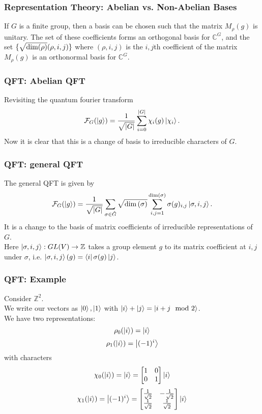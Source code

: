 \documentclass{beamer}
\renewcommand{\bra}{\Bra}
\renewcommand{\ket}{\Ket}
\newcommand{\abs}[1]{\left\lvert #1 \right\rvert}
\renewcommand{\dim}[1]{\textnormal{dim}\left(#1\right)}
\newcommand{\bb}[1]{\mathbb{#1}}
\renewcommand{\cal}[1]{\mathcal{#1}}
\begin{document}
\begin{frame}
\frametitle{Representation Theory: Abelian vs. Non-Abelian Bases}
        \begin{theorem}\label{thm:matrix_coefficients}
                If $G$ is a finite group, then a basis can be chosen such that the matrix $M_\rho(g)$ is unitary. The set of these coefficients forms an orthogonal basis for $\bb{C}^G$, and the set $\{\sqrt{\textnormal{dim}(\rho)} (\rho, i, j)\}$ where $(\rho, i, j)$ is the $i,j$th coefficient of the matrix $M_\rho(g)$ is an orthonormal basis for $\bb{C}^G$.
        \end{theorem}
\end{frame}

\begin{frame}
\frametitle{QFT: Abelian QFT}
        Revisiting the quantum fourier transform
                $$\cal{F}_G(\ket{g}) = \frac{1}{\sqrt{\abs{G}}} \sum_{i=0}^{\abs{G}} \chi_i(g) \ket{\chi_i}.$$
        Now it is clear that this is a change of basis to irreducible characters of $G$.
\end{frame}

\begin{frame}
\frametitle{QFT: general QFT}
    The general QFT is given by
        $$\cal{F}_G(\ket{g}) = \frac{1}{\sqrt{\abs{G}}} \sum_{\sigma \in \hat{G}} \sqrt{\dim{\sigma}} \sum_{i,j = 1}^{\dim{\sigma}} \sigma(g)_{i,j} \ket{\sigma, i, j}.$$
    It is a change to the basis of matrix coefficients of irreducible representations of $G$.\\
    Here $\ket{\sigma, i, j}: GL(V) \to \bb{Z}$ takes a group element $g$ to its matrix coefficient at $i, j$ under $\sigma$, i.e. $\ket{\sigma, i, j}(g) = \bra{i}\sigma(g) \ket{j}$.
\end{frame}

\begin{frame}
\frametitle{QFT: Example}
        Consider $\bb{Z}^2$.\\\pause
        We write our vectors as $\ket{0}, \ket{1}$ with $\ket{i} + \ket{j} = \ket{i + j \mod 2}$.\\\pause
        We have two representations:\\\pause
                $$\rho_0(\ket{i}) = \ket{i}$$\pause
                $$\rho_1(\ket{i}) = \ket{(-1)^i}$$\pause
        with characters\pause
                $$\chi_0(\ket{i}) = \ket{i} = \begin{bmatrix} 1 & 0\\ 0 & 1\end{bmatrix} \ket{i}$$\pause
                $$\chi_1(\ket{i}) = \ket{(-1)^i} = \begin{bmatrix} \frac{1}{\sqrt{2}} & -\frac{1}{\sqrt{2}}\\ \frac{1}{\sqrt{2}} & \frac{1}{\sqrt{2}}\end{bmatrix} \ket{i}$$
\end{frame}
\end{document}
